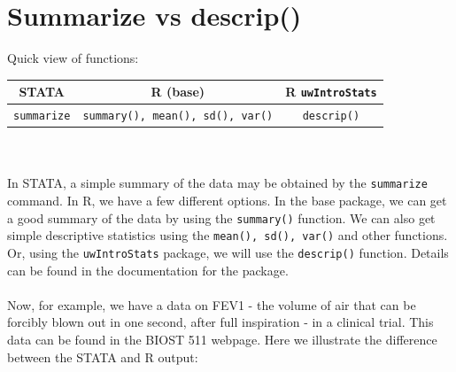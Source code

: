 \documentclass[11pt,letterpaper,fleqn]{report}
\begin{document}
\section{Summarize vs descrip()}
Quick view of functions:\\
\begin{tabular}{ccc}
STATA & R (base) & R \texttt{uwIntroStats}\\
\hline
\texttt{summarize} & \texttt{summary(), mean(), sd(), var()} & \texttt{descrip()}
\end{tabular}\\
\\
In STATA, a simple summary of the data may be obtained by the \texttt{summarize} command. In R, we have a few different options. In the base package, we can get a good summary of the data by using the \texttt{summary()} function. We can also get simple descriptive statistics using the \texttt{mean(), sd(), var()} and other functions. Or, using the \texttt{uwIntroStats} package, we will use the \texttt{descrip()} function. Details can be found in the documentation for the package. \\
\\Now, for example, we have a data on FEV1 - the volume of air that can be forcibly blown out in one second, after full inspiration - in a clinical trial. This data can be found in the BIOST 511 webpage. Here we illustrate the difference between the STATA and R output:\\
\end{document}
